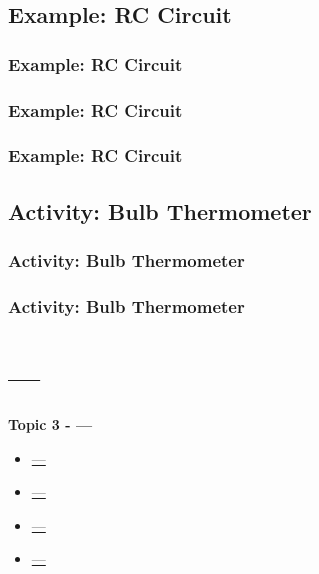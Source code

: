 \documentclass[fleqn]{beamer} %
\newcommand{\sectionIIItitle}{---}
\newcommand{\sectionIIsubsectionIIItitle}{Example: RC Circuit}
\newcommand{\sectionIIsubsectionIVtitle}{Activity: Bulb Thermometer}
\newcommand{\sectionIIIsubsectionItitle}{---}
\newcommand{\sectionIIIsubsectionIItitle}{---}
\newcommand{\sectionIIIsubsectionIIItitle}{---}
\newcommand{\sectionIIIsubsectionIVtitle}{---}
\begin{document}
		\subsection{\sectionIIsubsectionIIItitle}\label{sectionIIsubsectionIII}

			\begin{frame}
				\frametitle{\sectionIIsubsectionIIItitle}

				\bigskip


			\end{frame}

			\begin{frame}
				\frametitle{\sectionIIsubsectionIIItitle}

			\end{frame}

			\begin{frame}
			\frametitle{\sectionIIsubsectionIIItitle}





			\end{frame}

		\subsection{\sectionIIsubsectionIVtitle}\label{sectionIIsubsectionIV}

			\begin{frame}
				\frametitle{\sectionIIsubsectionIVtitle}


			\end{frame}

			\begin{frame}
				\frametitle{\sectionIIsubsectionIVtitle}


			\end{frame}
		
	\section{\sectionIIItitle}\label{sectionIII}

		\begin{frame}
			\large \textbf{Topic 3 - \sectionIIItitle} \vspace{3mm}\\

			\begin{itemize}
				\item \hyperlink{sectionIIIsubsectionI}{\sectionIIIsubsectionItitle} \vspc %
				\item \hyperlink{sectionIIIsubsectionII}{\sectionIIIsubsectionIItitle} \vspc %
				\item \hyperlink{sectionIIIsubsectionIII}{\sectionIIIsubsectionIIItitle} \vspc %
				\item \hyperlink{sectionIIIsubsectionIV}{\sectionIIIsubsectionIVtitle} \vspc %
			\end{itemize}

		\end{frame}
\end{document}
